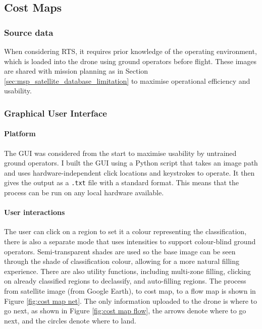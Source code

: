 \subsection{Cost Maps}\label{sub_section:tgt_cost_maps}
\subsubsection{Source data}\label{sub_sub_section:tgt_source_data}
When considering \gls{RTS}, it requires prior knowledge of the operating environment, which is loaded into the drone using ground operators before flight. These images are shared with mission planning as in Section \ref{sec:msp_satellite_database_limitation} to maximise operational efficiency and usability. 

\subsubsection{Graphical User Interface}\label{sub_sub_section:tgt_GUI}
\paragraph{Platform} 
The \gls{GUI} was considered from the start to maximise usability by untrained ground operators. I built the \gls{GUI} using a Python script that takes an image path and uses hardware-independent click locations and keystrokes to operate. It then gives the output as a \texttt{.txt} file with a standard format. This means that the process can be run on any local hardware available.
\paragraph{User interactions}
The user can click on a region to set it a colour representing the classification, there is also a separate mode that uses intensities to support colour-blind ground operators. Semi-transparent shades are used so the base image can be seen through the shade of classification colour, allowing for a more natural filling experience. There are also utility functions, including multi-zone filling, clicking on already classified regions to declassify, and auto-filling regions. The process from satellite image (from Google Earth), to cost map, to a flow map is shown in Figure \ref{fig:cost map net}. The only information uploaded to the drone is where to go next, as shown in Figure \ref{fig:cost map flow}, the arrows denote where to go next, and the circles denote where to land.

